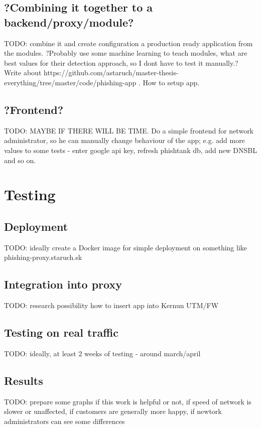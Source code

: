 \documentclass[
  digital, %
  twoside, %
  table,   %
  nolof,     %
  nolot,     %
]{fithesis3}
\begin{document}
\section{?Combining it together to a backend/proxy/module?}
TODO: combine it and create configuration a production ready application from the modules. ?Probably use some machine learning to teach modules, what are best values for their detection approach, so I dont have to test it manually.? Write about https://github.com/astaruch/master-thesis-everything/tree/master/code/phishing-app . How to setup app.

\section{?Frontend?}
TODO: MAYBE IF THERE WILL BE TIME. Do a simple frontend for network administrator, so he can manually change behaviour of the app; e.g. add more values to some tests - enter google api key, refresh phishtank db, add new DNSBL and so on.

\chapter{Testing}

\section{Deployment}
TODO: ideally create a Docker image for simple deployment on something like phishing-proxy.staruch.sk

\section{Integration into proxy}
TODO: research possibility how to insert app into Kernun UTM/FW 

\section{Testing on real traffic}
TODO: ideally, at least 2 weeks of testing - around march/april

\section{Results}
TODO: prepare some graphs if this work is helpful or not, if speed of network is slower or unaffected, if customers are generally more happy, if newtork administrators can see some differences
\end{document}
